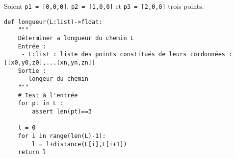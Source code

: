 Soient \texttt{p1 = [0,0,0]}, \texttt{p2 = [1,0,0]} et  \texttt{p3 = [2,0,0]} trois points.





\ifprof
\begin{lstlisting}
def longueur(L:list)->float:
    """
    Déterminer a longueur du chemin L
    Entrée : 
     - L:list : liste des points constitués de leurs cordonnées : [[x0,y0,z0],...[xn,yn,zn]]
    Sortie :
     - longeur du chemin
    """
    # Test à l'entrée
    for pt in L :
        assert len(pt)==3
    
    l = 0
    for i in range(len(L)-1):
        l = l+distance(L[i],L[i+1])
    return l
\end{lstlisting}

\else
\fi

